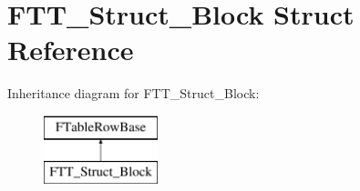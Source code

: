 \hypertarget{struct_f_t_t___struct___block}{}\section{F\+T\+T\+\_\+\+Struct\+\_\+\+Block Struct Reference}
\label{struct_f_t_t___struct___block}
Inheritance diagram for F\+T\+T\+\_\+\+Struct\+\_\+\+Block\+:\begin{figure}[H]
\begin{center}
\leavevmode
\includegraphics[height=2.000000cm]{struct_f_t_t___struct___block}
\end{center}
\end{figure}
